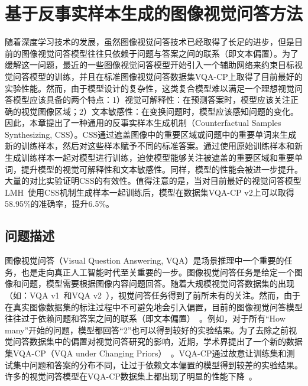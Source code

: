 \chapter{基于反事实样本生成的图像视觉问答方法}

随着深度学习技术的发展，虽然图像视觉问答技术已经取得了长足的进步，但是目前的图像视觉问答模型往往只依赖于问题与答案之间的联系（即文本偏置）。为了缓解这一问题，最近的一些图像视觉问答模型开始引入一个辅助网络来约束目标视觉问答模型的训练，并且在标准图像视觉问答数据集VQA-CP上取得了目前最好的实验性能。然而，由于模型设计的复杂性，这类复合模型难以满足一个理想视觉问答模型应该具备的两个特点：1）视觉可解释性：在预测答案时，模型应该关注正确的视觉图像区域；2）文本敏感性：在变换问题时，模型应该感知问题的变化。因此，本章提出了一种通用的反事实样本生成机制（Counterfactual Samples Synthesizing, CSS）。CSS通过遮盖图像中的重要区域或问题中的重要单词来生成新的训练样本，然后对这些样本赋予不同的标准答案。通过使用原始训练样本和新生成训练样本一起对模型进行训练，迫使模型能够关注被遮盖的重要区域和重要单词，提升模型的视觉可解释性和文本敏感性。同样，模型的性能会被进一步提升。大量的对比实验证明CSS的有效性。值得注意的是，当对目前最好的视觉问答模型LMH~\cite{clark2019don}使用CSS机制生成样本一起训练后，模型在数据集VQA-CP v2上可以取得58.95\%的准确率，提升6.5\%。

\section{问题描述} \label{ch7:sec:introduction}
图像视觉问答（Visual Question Answering, VQA）是场景推理中一个重要的任务，也是走向真正人工智能时代至关重要的一步。图像视觉问答任务是给定一个图像和问题，模型需要根据图像内容问题回答。随着大规模视觉问答数据集的出现（如：VQA v1~\cite{antol2015vqa}和VQA v2~\cite{goyal2017making}），视觉问答任务得到了前所未有的关注。然而，由于在真实图像数据集的标注过程中不可避免地会引入偏置，目前的图像视觉问答模型往往过于依赖问题和答案之间的联系（即文本偏置）~\cite{agrawal2016analyzing,zhang2016yin,johnson2017clevr,goyal2017making}。例如，对于所有“How many”开始的问题，模型都回答“2”也可以得到较好的实验结果。为了去除之前视觉问答数据集中的偏置对视觉问答研究的影响，近期，学术界提出了一个新的数据集VQA-CP（VQA under Changing Priors）~\cite{agrawal2018don}。VQA-CP通过故意让训练集和测试集中问题和答案的分布不同，让过于依赖文本偏置的模型得到较差的实验结果。许多的视觉问答模型在VQA-CP数据集上都出现了明显的性能下降~\cite{andreas2016neural,fukui2016multimodal,yang2016stacked,anderson2018bottom}。

